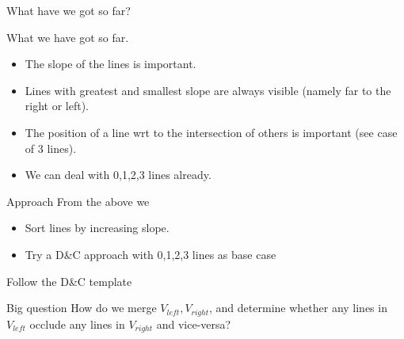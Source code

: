 \documentclass[ignorenonframetext,]{beamer}
\begin{document}
\begin{frame}{What have we got so far?}

  \begin{block}{What we have got so far.}
    \begin{itemize}
    \item The slope of the lines is important.
    \item Lines with greatest and smallest slope are always visible
      (namely far to the right or left).
    \item The position of a line wrt to the intersection of others is
      important (see case of 3 lines).
    \item We can deal with 0,1,2,3 lines already.
    \end{itemize}
  \end{block}
  \pause
  \begin{block}{Approach}
    From the above we
    \begin{itemize}
    \item Sort lines by increasing slope.
    \item Try a D\&C approach with 0,1,2,3 lines as base case
    \end{itemize}
  \end{block}
\end{frame}


\begin{frame}{Follow the D\&C template}

  \begin{algorithm}[H]
    \caption{Nascent Algorithm D\&C}
    \begin{algorithmic}
      \footnotesize

      \EndIf
      \EndProcedure
    \end{algorithmic}
    \end{algorithm}
    \pause
    \footnotesize
    \begin{block}{Big question}
      How do we merge $V_{left}, V_{right}$, and determine whether any
      lines in $V_{left}$ occlude any lines in $V_{right}$ and vice-versa?
    \end{block}
  \end{frame}
\end{document}
